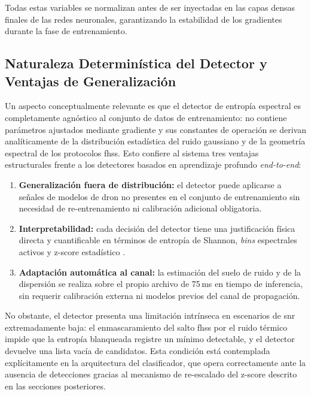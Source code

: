 Todas estas variables se normalizan antes de ser inyectadas en las capas densas finales de las redes neuronales, garantizando la estabilidad de los gradientes durante la fase de entrenamiento.

\subsection{Naturaleza Determinística del Detector y Ventajas de Generalización}
\label{subsec:detector_deterministico}

Un aspecto conceptualmente relevante es que el detector de entropía espectral es completamente agnóstico al conjunto de datos de entrenamiento: no contiene parámetros ajustados mediante gradiente y sus constantes de operación se derivan analíticamente de la distribución estadística del ruido gaussiano y de la geometría espectral de los protocolos \gls{fhss}. Esto confiere al sistema tres ventajas estructurales frente a los detectores basados en aprendizaje profundo \textit{end-to-end}:

\begin{enumerate}\itemsep 0em
    \item \textbf{Generalización fuera de distribución:} el detector puede aplicarse a señales de modelos de dron no presentes en el conjunto de entrenamiento sin necesidad de re-entrenamiento ni calibración adicional obligatoria.
    \item \textbf{Interpretabilidad:} cada decisión del detector tiene una justificación física directa y cuantificable en términos de entropía de Shannon, \textit{bins} espectrales activos y z-score estadístico \cite{fu_radio_2024}.
    \item \textbf{Adaptación automática al canal:} la estimación del suelo de ruido y de la dispersión se realiza sobre el propio archivo de 75\,ms en tiempo de inferencia, sin requerir calibración externa ni modelos previos del canal de propagación.
\end{enumerate}

No obstante, el detector presenta una limitación intrínseca en escenarios de \gls{snr} extremadamente baja: el enmascaramiento del salto \gls{fhss} por el ruido térmico impide que la entropía blanqueada registre un mínimo detectable, y el detector devuelve una lista vacía de candidatos. Esta condición está contemplada explícitamente en la arquitectura del clasificador, que opera correctamente ante la ausencia de detecciones gracias al mecanismo de re-escalado del z-score descrito en las secciones posteriores.

